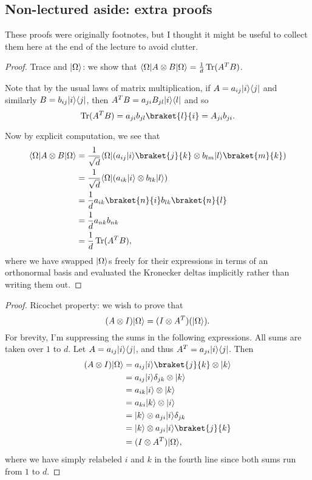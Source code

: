 \subsection*{Non-lectured aside: extra proofs}
These proofs were originally footnotes, but I thought it might be useful to collect them here at the end of the lecture to avoid clutter.

\begin{proof}
    Trace and $\lvert\Omega\rangle$: we show that $\langle\Omega\rvert A\otimes B\lvert\Omega\rangle=\frac{1}{d}\operatorname{Tr}(A^T B)$.
    
    Note that by the usual laws of matrix multiplication, if $A=a_{ij}\lvert i\rangle\langle j\rvert$ and similarly $B=b_{ij}\lvert i\rangle\langle j\rvert$, then $A^TB=a_{ji}B_{jl}\lvert i\rangle\langle l\rvert$ and so 
    \begin{equation}
        \Tr(A^T B)=a_{ji} b_{jl} \braket{l}{i}=A_{ji}b_{ji}.
    \end{equation}
    
    Now by explicit computation, we see that
    \begin{align*}
        \bra{\Omega}A\otimes B\ket{\Omega}&= \frac{1}{\sqrt{d}}\bra{\Omega}(a_{ij} \ket{i}\braket{j}{k} \otimes b_{lm} \ket{l} \braket{m}{k})\\
        &=\frac{1}{\sqrt{d}} \bra{\Omega} (a_{ik} \ket{i} \otimes b_{lk} \ket{l})\\
        &= \frac{1}{d} a_{ik} \braket{n}{i} b_{lk} \braket{n}{l}\\
        &= \frac{1}{d} a_{nk} b_{nk}\\
        &= \frac{1}{d} \Tr(A^T B),
    \end{align*}
    where we have swapped $\lvert\Omega\rangle$s freely for their expressions in terms of an orthonormal basis and evaluated the Kronecker deltas implicitly rather than writing them out.
\end{proof}

\begin{proof}
    Ricochet property: we wish to prove that
    \begin{equation*}
        (A\otimes I)\lvert\Omega\rangle=(I\otimes A^T)(\lvert\Omega\rangle).
    \end{equation*}
    For brevity, I'm suppressing the sums in the following expressions. All sums are taken over $1$ to $d$. Let $A=a_{ij}\lvert i\rangle\langle j\rvert$, and thus $A^T=a_{ji}\lvert i\rangle\langle j\rvert$. Then
    \begin{align*}
        (A\otimes I)\ket{\Omega} &= a_{ij}\ket{i} \braket{j}{k}\otimes \ket{k}\\
            &= a_{ij} \ket{i} \delta_{jk} \otimes \ket{k}\\
            &= a_{ik} \ket{i} \otimes \ket{k}\\
            &= a_{ki} \ket{k} \otimes \ket{i}\\
            &= \ket{k} \otimes a_{ji}\ket{i} \delta_{jk}\\
            &= \ket{k} \otimes a_{ji}\ket{i}\braket{j}{k}\\
            &= (I\otimes A^T)\ket{\Omega},
    \end{align*}
    where we have simply relabeled $i$ and $k$ in the fourth line since both sums run from $1$ to $d$.
\end{proof}